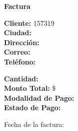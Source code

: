 \documentclass{article}
\begin{document}
\begin{center}
    {\LARGE \textbf{Factura}}\\[1cm]
\end{center}

\textbf{Cliente:} 157319 \\
\textbf{Ciudad:}  \\
\textbf{Dirección:}  \\
\textbf{Correo:}  \\
\textbf{Teléfono:}  \\

\vspace{0.5cm}

\textbf{Cantidad:}  \\
\textbf{Monto Total:} \$  \\
\textbf{Modalidad de Pago:}  \\
\textbf{Estado de Pago:}  \\

\vspace{1cm}

Fecha de la factura: 
\end{document}
